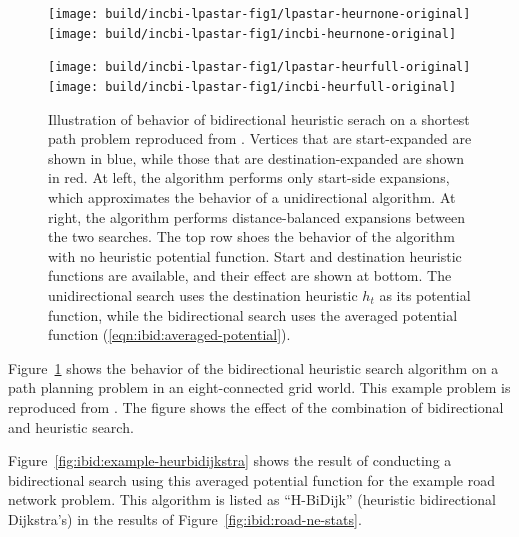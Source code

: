 \begin{figure}
   \centering%
   
   \texttt{[image: build/incbi-lpastar-fig1/lpastar-heurnone-original]}%
   \;\;%
   \texttt{[image: build/incbi-lpastar-fig1/incbi-heurnone-original]}%
   
   
   \vspace{0.2cm}
   
   \texttt{[image: build/incbi-lpastar-fig1/lpastar-heurfull-original]}%
   \;\;%
   \texttt{[image: build/incbi-lpastar-fig1/incbi-heurfull-original]}%
   
   \caption{Illustration of behavior of bidirectional heuristic serach
      on a shortest path problem reproduced
      from \citep{koenig2004lpastar}.
      Vertices that are start-expanded are shown in blue,
      while those that are destination-expanded are shown in red.
      At left, the algorithm performs only start-side expansions,
      which approximates the behavior of a unidirectional algorithm.
      At right, the algorithm  performs distance-balanced expansions
      between the two searches.
      The top row shoes the behavior of the algorithm with no
      heuristic potential function.
      Start and destination heuristic functions are available,
      and their effect are shown at bottom.
      The unidirectional search uses the destination heuristic $h_t$
      as its potential function,
      while the bidirectional search uses the averaged potential
      function (\ref{eqn:ibid:averaged-potential}).
      }
   \label{fig:incbi-lpastar-fig1-heurchange}
\end{figure}

Figure~\ref{fig:incbi-lpastar-fig1-heurchange} shows the behavior
of the bidirectional heuristic search algorithm
on a path planning problem in an eight-connected grid world.
This example problem is reproduced from \citep{koenig2004lpastar}.
The figure shows the effect of the combination of bidirectional
and heuristic search.

Figure~\ref{fig:ibid:example-heurbidijkstra} shows the result
of conducting a bidirectional search using this averaged
potential function for the example road network problem.
This algorithm is listed as ``H-BiDijk''
(heuristic bidirectional Dijkstra's)
in the results of Figure~\ref{fig:ibid:road-ne-stats}.

